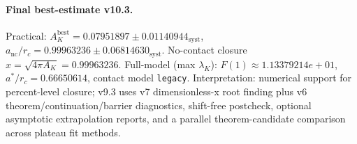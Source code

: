 \paragraph{Final best-estimate v10.3.}
Practical: $A_K^{\mathrm{best}} = 0.07951897 \pm 0.01140944_{\mathrm{syst}}$, $a_{\mathrm{nc}}/r_c = 0.99963236 \pm 0.06814630_{\mathrm{syst}}$.
No-contact closure $x = \sqrt{4\pi A_K} = 0.99963236$.
Full-model (max $\lambda_K$): $F(1) \approx 1.13379214e+01$, $a^*/r_c = 0.66650614$, contact model \texttt{legacy}.
Interpretation: numerical support for percent-level closure; v9.3 uses v7 dimensionless-x root finding plus v6 theorem/continuation/barrier diagnostics, shift-free postcheck, optional asymptotic extrapolation reports, and a parallel theorem-candidate comparison across plateau fit methods.
